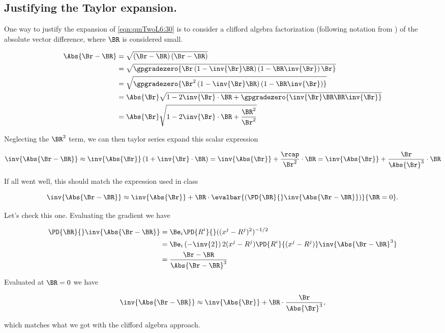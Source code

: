 \subsection{Justifying the Taylor expansion.}

One way to justify the expansion of \ref{eqn:qmTwoL6:30} is to consider a clifford algebra factorization (following notation from \cite{doran2003gap}) of the absolute vector difference, where $\BR$ is considered small.

\begin{align*}
\Abs{\Br - \BR}
&= \sqrt{ \left(\Br - \BR\right) \left(\Br - \BR\right) } \\
&= \sqrt{ \gpgradezero{\Br \left(1 - \inv{\Br} \BR\right) \left(1 - \BR \inv{\Br}\right) \Br} } \\
&= \sqrt{ \gpgradezero{\Br^2 \left(1 - \inv{\Br} \BR\right) \left(1 - \BR \inv{\Br}\right) } } \\
&= \Abs{\Br} \sqrt{ 1 - 2 \inv{\Br} \cdot \BR + \gpgradezero{\inv{\Br} \BR \BR \inv{\Br}}} \\
&= \Abs{\Br} \sqrt{ 1 - 2 \inv{\Br} \cdot \BR + \frac{\BR^2}{\Br^2}}
\end{align*}

Neglecting the $\BR^2$ term, we can then taylor series expand this scalar expression 

\begin{equation}\label{eqn:qmTwoL6:150}
\inv{\Abs{\Br - \BR}} 
\approx
\inv{\Abs{\Br}} \left( 
1 + \inv{\Br} \cdot \BR
\right) 
=
\inv{\Abs{\Br}} 
+ \frac{\rcap}{\Br^2} \cdot \BR
=
\inv{\Abs{\Br}} 
+ \frac{\Br}{\Abs{\Br}^3} \cdot \BR
\end{equation}

If all went well, this should match the expression used in class

\begin{equation}\label{eqn:qmTwoL6:170}
\inv{\Abs{\Br - \BR}} \approx \inv{\Abs{\Br}} 
+ 
\BR \cdot \evalbar{\left(
\PD{\BR}{} \inv{\Abs{ \Br - \BR}}
\right)}{\BR = 0}.
\end{equation}

Let's check this one.  Evaluating the gradient we have

\begin{align*}
\PD{\BR}{} \inv{\Abs{ \Br - \BR}}
&=
\Be_i \PD{R^i}{} ((x^j - R^j)^2)^{-1/2} \\
&=
\Be_i \left(-\inv{2}\right) 2 (x^j - R^j) \PD{R^i}{(x^j - R^j)} \inv{\Abs{\Br - \BR}^3} \\
&= \frac{\Br - \BR}{
\Abs{\Br - \BR}^3} 
\end{align*}

Evaluated at $\BR = 0$ we have

\begin{equation}\label{eqn:qmTwoL6:190}
\inv{\Abs{\Br - \BR}} \approx \inv{\Abs{\Br}} 
+ 
\BR \cdot \frac{\Br}{\Abs{\Br}^3},
\end{equation}

which matches what we got with the clifford algebra approach.

\EndArticle
